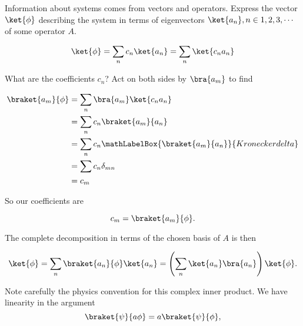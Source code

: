 %
%
%

Information about systems comes from vectors and operators.  Express the vector \(\ket{\phi}\) describing the system in terms of eigenvectors \(\ket{a_n}, n \in 1,2,3,\cdots\) of some operator \(A\).

\begin{equation}\label{eqn:PHY356FLecture10:51}
\ket{\phi} = \sum_n c_n \ket{a_n} = \sum_n \ket{c_n a_n}
\end{equation}

What are the coefficients \(c_n\)?  Act on both sides by \(\bra{a_m}\) to find

\begin{equation}\label{eqn:lecture5BigReviewCh1Formalism:71}
\begin{aligned}
\braket{a_m}{\phi}
&= \sum_n \bra{a_m} \ket{ c_n a_n } \\
&= \sum_n c_n \braket{a_m}{ a_n } \\
&= \sum_n c_n 
\mathLabelBox{\braket{a_m}{a_n}}{Kronecker delta}
\\
&= \sum c_n \delta_{mn} \\
&= c_m
\end{aligned}
\end{equation}

So our coefficients are

\begin{equation}\label{eqn:PHY356FLecture10:51c}
c_m = \braket{a_m}{\phi}.
\end{equation}

The complete decomposition in terms of the chosen basis of \(A\) is then

\begin{equation}\label{eqn:PHY356FLecture10:51b}
\ket{\phi} = \sum_n \braket{a_n}{\phi} \ket{a_n}
= \left( \sum_n \ket{a_n} \bra{a_n} \right) \ket{\phi}.
\end{equation}

Note carefully the physics convention for this complex inner product.  We have linearity in the  argument
\begin{equation}\label{eqn:PHY356FLecture10:51e}
\braket{\psi}{a \phi} = a \braket{\psi}{\phi},
\end{equation}

